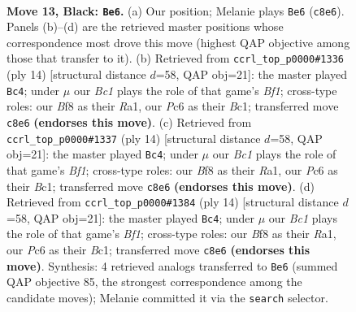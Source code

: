 \documentclass[11pt]{article}
\begin{document}
\clearpage

\begin{figure}[p]\centering
\begin{subfigure}{0.46\textwidth}\centering
\resizebox{\linewidth}{!}{%
\newchessgame
\chessboard[
  setfen={r1b1kb1r/p3n1pp/2pp4/5p2/8/N2B1P2/PPP3PP/R1B2RK1 b kq - 1 13},
  showmover=false,
  pgfstyle=straightmove, color=movearrow, markmove={c8-e6}
]}
\caption{}
\end{subfigure}\hfill
\begin{subfigure}{0.46\textwidth}\centering
\resizebox{\linewidth}{!}{%
\newchessgame
\chessboard[
  setfen={r1bk1b1r/pp2pp1p/2p2np1/8/4P3/2N5/PPP2PPP/R1B1KB1R w KQ - 0 8},
  showmover=false,
  pgfstyle=straightmove, color=movearrow, markmove={f1-c4}
]}
\caption{}
\end{subfigure}
\\[4pt]
\begin{subfigure}{0.46\textwidth}\centering
\resizebox{\linewidth}{!}{%
\newchessgame
\chessboard[
  setfen={r1bk1b1r/pp2pp1p/2p2np1/8/4P3/2N5/PPP2PPP/R1B1KB1R w KQ - 0 8},
  showmover=false,
  pgfstyle=straightmove, color=movearrow, markmove={f1-c4}
]}
\caption{}
\end{subfigure}\hfill
\begin{subfigure}{0.46\textwidth}\centering
\resizebox{\linewidth}{!}{%
\newchessgame
\chessboard[
  setfen={r1bk1b1r/pp2pp1p/2p2np1/8/4P3/2N5/PPP2PPP/R1B1KB1R w KQ - 0 8},
  showmover=false,
  pgfstyle=straightmove, color=movearrow, markmove={f1-c4}
]}
\caption{}
\end{subfigure}
\caption{\textbf{Move 13, Black: \texttt{Be6}.} (a) Our position; Melanie plays \texttt{Be6} (\texttt{c8e6}). Panels (b)--(d) are the retrieved master positions whose correspondence most drove this move (highest QAP objective among those that transfer to it). (b) Retrieved from \texttt{ccrl\_top\_p0000\#1336} (ply 14) [structural distance $d$=58, QAP obj=21]: the master played \texttt{Bc4}; under $\mu$ our \emph{Bc1} plays the role of that game's \emph{Bf1}; cross-type roles: our \emph{B}f8 as their \emph{R}a1, our \emph{P}c6 as their \emph{B}c1; transferred move \texttt{c8e6} \textbf{(endorses this move)}. (c) Retrieved from \texttt{ccrl\_top\_p0000\#1337} (ply 14) [structural distance $d$=58, QAP obj=21]: the master played \texttt{Bc4}; under $\mu$ our \emph{Bc1} plays the role of that game's \emph{Bf1}; cross-type roles: our \emph{B}f8 as their \emph{R}a1, our \emph{P}c6 as their \emph{B}c1; transferred move \texttt{c8e6} \textbf{(endorses this move)}. (d) Retrieved from \texttt{ccrl\_top\_p0000\#1384} (ply 14) [structural distance $d$=58, QAP obj=21]: the master played \texttt{Bc4}; under $\mu$ our \emph{Bc1} plays the role of that game's \emph{Bf1}; cross-type roles: our \emph{B}f8 as their \emph{R}a1, our \emph{P}c6 as their \emph{B}c1; transferred move \texttt{c8e6} \textbf{(endorses this move)}. Synthesis: 4 retrieved analogs transferred to \texttt{Be6} (summed QAP objective 85, the strongest correspondence among the candidate moves); Melanie committed it via the \texttt{search} selector.}
\label{fig:thought-m25}
\end{figure}
\end{document}
